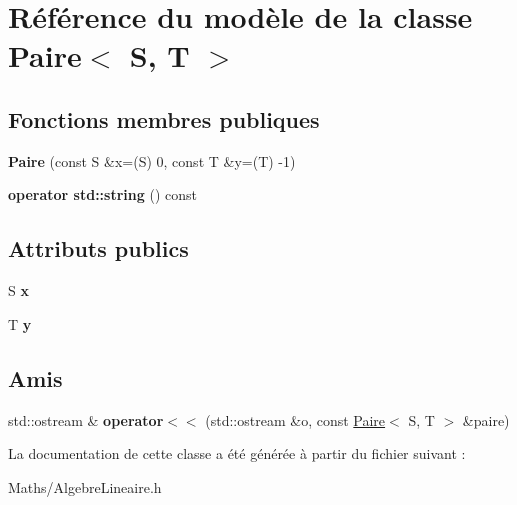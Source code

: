 \hypertarget{class_paire}{}\section{Référence du modèle de la classe Paire$<$ S, T $>$}
\label{class_paire}
\subsection*{Fonctions membres publiques}
\begin{DoxyCompactItemize}
\item 
\mbox{\label{class_paire_a21c9ba52fb6e3a7da4656a13b68a392c}} 
{\bfseries Paire} (const S \&x=(S) 0, const T \&y=(T) -\/1)
\item 
\mbox{\label{class_paire_aa40020123d8bf0f12eb6496a9e398650}} 
{\bfseries operator std\+::string} () const
\end{DoxyCompactItemize}
\subsection*{Attributs publics}
\begin{DoxyCompactItemize}
\item 
\mbox{\label{class_paire_ad56195b97db4252aa83ade8d26f7bac1}} 
S {\bfseries x}
\item 
\mbox{\label{class_paire_aa66b83a8895e0952304155756fb9fab5}} 
T {\bfseries y}
\end{DoxyCompactItemize}
\subsection*{Amis}
\begin{DoxyCompactItemize}
\item 
\mbox{\label{class_paire_a1678b785460f16636eb93498f468eb81}} 
std\+::ostream \& {\bfseries operator$<$$<$} (std\+::ostream \&o, const \mbox{\hyperlink{class_paire}{Paire}}$<$ S, T $>$ \&paire)
\end{DoxyCompactItemize}


La documentation de cette classe a été générée à partir du fichier suivant \+:\begin{DoxyCompactItemize}
\item 
Maths/Algebre\+Lineaire.\+h\end{DoxyCompactItemize}
